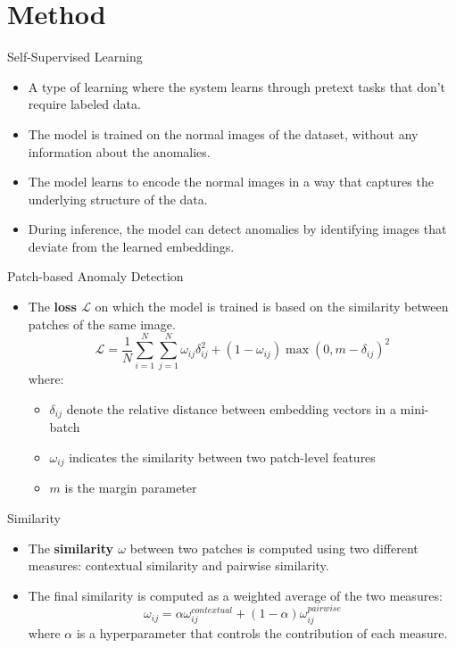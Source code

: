 \documentclass{beamer}
\begin{document}
\section{Method}
\begin{frame}{Self-Supervised Learning}
      \begin{itemize}
          \item A type of learning where the system learns through
           pretext tasks that don't require labeled data.
              \item The model is trained on the normal images of the dataset, without
               any information about the anomalies.
                  \item The model learns to encode the normal images in a way that
                   captures the underlying structure of the data.
                      \item During inference, the model can detect anomalies by
                       identifying images that deviate from the learned embeddings.
          \end{itemize}
  \end{frame}
\begin{frame}{Patch-based Anomaly Detection}
      \begin{itemize}
          \item The \textbf{loss $\mathcal{L}$} on which the model is trained is based on the similarity
           between patches of the same image.
           \begin{equation} \mathcal{L} = \frac{1}{N}\sum_{i=1}^{N} \sum_{j=1}^{N} 
            \omega_{ij}\delta_{ij}^2 + (1 - \omega_{ij})\max(0, m - \delta_{ij})^2
      \end{equation}
      where:
      \begin{itemize}
      \item $\delta_{ij}$ denote the relative distance between embedding vectors in a mini-batch
      \item $\omega_{ij}$ indicates the similarity between two patch-level features
      \item $m$ is the margin parameter
\end{itemize}
\end{itemize}
\end{frame}
\begin{frame}{Similarity}
      \begin{itemize}
              \item The \textbf{similarity $\omega$} between two patches is computed using two different
               measures: contextual similarity and pairwise similarity.
              \item The final similarity is computed as a weighted average of the two
               measures:
                  \begin{equation}
                         \omega_{ij} = \alpha\omega_{ij}^{contextual} + (1 - \alpha)\omega_{ij}^{pairwise}
                  \end{equation}
                  where $\alpha$ is a hyperparameter that controls the contribution of
                   each measure.
                  \end{itemize}
  \end{frame}
\end{document}
